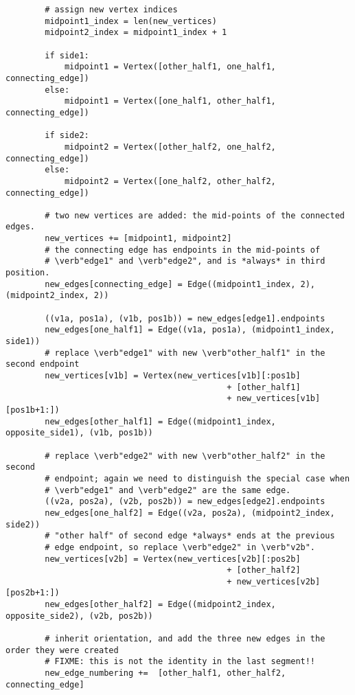 \begin{lstlisting}
        # assign new vertex indices
        midpoint1_index = len(new_vertices)
        midpoint2_index = midpoint1_index + 1

        if side1:
            midpoint1 = Vertex([other_half1, one_half1, connecting_edge])
        else:
            midpoint1 = Vertex([one_half1, other_half1, connecting_edge])

        if side2:
            midpoint2 = Vertex([other_half2, one_half2, connecting_edge])
        else:
            midpoint2 = Vertex([one_half2, other_half2, connecting_edge])

        # two new vertices are added: the mid-points of the connected edges.
        new_vertices += [midpoint1, midpoint2]
        # the connecting edge has endpoints in the mid-points of
        # \verb"edge1" and \verb"edge2", and is *always* in third position.
        new_edges[connecting_edge] = Edge((midpoint1_index, 2), (midpoint2_index, 2))

        ((v1a, pos1a), (v1b, pos1b)) = new_edges[edge1].endpoints
        new_edges[one_half1] = Edge((v1a, pos1a), (midpoint1_index, side1))
        # replace \verb"edge1" with new \verb"other_half1" in the second endpoint
        new_vertices[v1b] = Vertex(new_vertices[v1b][:pos1b]
                                             + [other_half1]
                                             + new_vertices[v1b][pos1b+1:])
        new_edges[other_half1] = Edge((midpoint1_index, opposite_side1), (v1b, pos1b))

        # replace \verb"edge2" with new \verb"other_half2" in the second
        # endpoint; again we need to distinguish the special case when
        # \verb"edge1" and \verb"edge2" are the same edge.
        ((v2a, pos2a), (v2b, pos2b)) = new_edges[edge2].endpoints
        new_edges[one_half2] = Edge((v2a, pos2a), (midpoint2_index, side2))
        # "other half" of second edge *always* ends at the previous
        # edge endpoint, so replace \verb"edge2" in \verb"v2b".
        new_vertices[v2b] = Vertex(new_vertices[v2b][:pos2b]
                                             + [other_half2]
                                             + new_vertices[v2b][pos2b+1:])
        new_edges[other_half2] = Edge((midpoint2_index, opposite_side2), (v2b, pos2b))

        # inherit orientation, and add the three new edges in the order they were created
        # FIXME: this is not the identity in the last segment!!
        new_edge_numbering +=  [other_half1, other_half2, connecting_edge]


\end{lstlisting}
